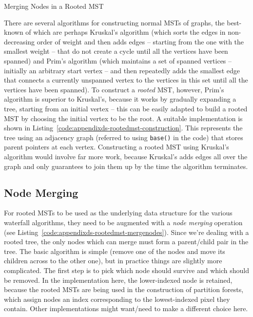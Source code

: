 \begin{stulisting}[p]
\caption{Merging Nodes in a Rooted MST}
\label{code:appendixds-rootedmst-mergenodes}

\end{stulisting}

\afterpage{\clearpage}

There are several algorithms for constructing normal MSTs of graphs, the best-known of which are perhaps Kruskal's algorithm (which sorts the edges in non-decreasing order of weight and then adds edges -- starting from the one with the smallest weight -- that do not create a cycle until all the vertices have been spanned) and Prim's algorithm (which maintains a set of spanned vertices -- initially an arbitrary start vertex -- and then repeatedly adds the smallest edge that connects a currently unspanned vertex to the vertices in this set until all the vertices have been spanned). To construct a \emph{rooted} MST, however, Prim's algorithm is superior to Kruskal's, because it works by gradually expanding a tree, starting from an initial vertex -- this can be easily adapted to build a rooted MST by choosing the initial vertex to be the root. A suitable implementation is shown in Listing~\ref{code:appendixds-rootedmst-construction}. This represents the tree using an adjacency graph (referred to using \texttt{base()} in the code) that stores parent pointers at each vertex. Constructing a rooted MST using Kruskal's algorithm would involve far more work, because Kruskal's adds edges all over the graph and only guarantees to join them up by the time the algorithm terminates.


\subsection{Node Merging}


For rooted MSTs to be used as the underlying data structure for the various waterfall algorithms, they need to be augmented with a \emph{node merging} operation (see Listing~\ref{code:appendixds-rootedmst-mergenodes}). Since we're dealing with a rooted tree, the only nodes which can merge must form a parent/child pair in the tree. The basic algorithm is simple (remove one of the nodes and move its children across to the other one), but in practice things are slightly more complicated. The first step is to pick which node should survive and which should be removed. In the implementation here, the lower-indexed node is retained, because the rooted MSTs are being used in the construction of partition forests, which assign nodes an index corresponding to the lowest-indexed pixel they contain. Other implementations might want/need to make a different choice here.

